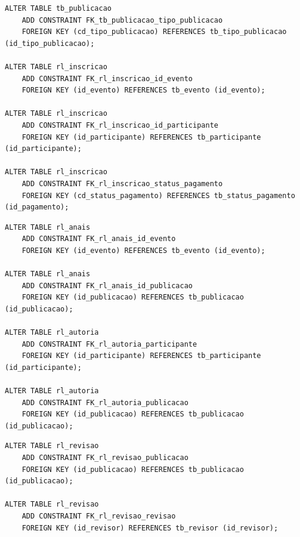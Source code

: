 \documentclass[12pt]{article}
\begin{document}
\noindent\begin{minipage}{\linewidth}
\begin{lstlisting}[caption={DDL --- chaves estrangeiras de \texttt{tb\_publicacao} e \texttt{rl\_inscricao}.}, label={lst:fk-publicacao-inscricao}]
ALTER TABLE tb_publicacao
    ADD CONSTRAINT FK_tb_publicacao_tipo_publicacao
    FOREIGN KEY (cd_tipo_publicacao) REFERENCES tb_tipo_publicacao (id_tipo_publicacao);

ALTER TABLE rl_inscricao
    ADD CONSTRAINT FK_rl_inscricao_id_evento
    FOREIGN KEY (id_evento) REFERENCES tb_evento (id_evento);

ALTER TABLE rl_inscricao
    ADD CONSTRAINT FK_rl_inscricao_id_participante
    FOREIGN KEY (id_participante) REFERENCES tb_participante (id_participante);

ALTER TABLE rl_inscricao
    ADD CONSTRAINT FK_rl_inscricao_status_pagamento
    FOREIGN KEY (cd_status_pagamento) REFERENCES tb_status_pagamento (id_pagamento);
\end{lstlisting}
\end{minipage}

\noindent\begin{minipage}{\linewidth}
\begin{lstlisting}[caption={DDL --- chaves estrangeiras de \texttt{rl\_anais} e \texttt{rl\_autoria}.}, label={lst:fk-anais-autoria}]
ALTER TABLE rl_anais
    ADD CONSTRAINT FK_rl_anais_id_evento
    FOREIGN KEY (id_evento) REFERENCES tb_evento (id_evento);

ALTER TABLE rl_anais
    ADD CONSTRAINT FK_rl_anais_id_publicacao
    FOREIGN KEY (id_publicacao) REFERENCES tb_publicacao (id_publicacao);

ALTER TABLE rl_autoria
    ADD CONSTRAINT FK_rl_autoria_participante
    FOREIGN KEY (id_participante) REFERENCES tb_participante (id_participante);

ALTER TABLE rl_autoria
    ADD CONSTRAINT FK_rl_autoria_publicacao
    FOREIGN KEY (id_publicacao) REFERENCES tb_publicacao (id_publicacao);
\end{lstlisting}
\end{minipage}

\noindent\begin{minipage}{\linewidth}
\begin{lstlisting}[caption={DDL --- chaves estrangeiras de \texttt{rl\_revisao}.}, label={lst:fk-revisao}]
ALTER TABLE rl_revisao
    ADD CONSTRAINT FK_rl_revisao_publicacao
    FOREIGN KEY (id_publicacao) REFERENCES tb_publicacao (id_publicacao);

ALTER TABLE rl_revisao
    ADD CONSTRAINT FK_rl_revisao_revisao
    FOREIGN KEY (id_revisor) REFERENCES tb_revisor (id_revisor);
\end{lstlisting}
\end{minipage}
\end{document}
